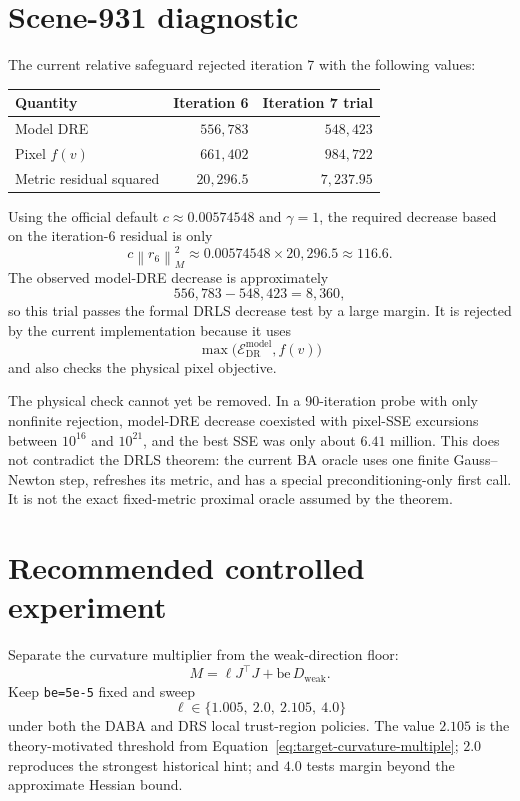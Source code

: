 \documentclass[11pt]{article}
\newcommand{\Edr}{\mathcal{E}_{\mathrm{DR}}}
\newcommand{\norm}[1]{\left\lVert #1\right\rVert}
\begin{document}
\section{Scene-931 diagnostic}

The current relative safeguard rejected iteration 7 with the following values:
\begin{center}
\begin{tabular}{lrr}
\toprule
Quantity & Iteration 6 & Iteration 7 trial \\
\midrule
Model DRE & $556{,}783$ & $548{,}423$ \\
Pixel $f(v)$ & $661{,}402$ & $984{,}722$ \\
Metric residual squared & $20{,}296.5$ & $7{,}237.95$ \\
\bottomrule
\end{tabular}
\end{center}

Using the official default $c\approx0.00574548$ and $\gamma=1$, the required
decrease based on the iteration-6 residual is only
\[
  c\norm{r_6}_M^2
  \approx0.00574548\times20{,}296.5
  \approx116.6.
\]
The observed model-DRE decrease is approximately
\[
  556{,}783-548{,}423=8{,}360,
\]
so this trial passes the formal DRLS decrease test by a large margin. It is
rejected by the current implementation because it uses
\begin{equation}
  \max\bigl(\Edr^{\mathrm{model}},f(v)\bigr)
  \label{eq:sandwich}
\end{equation}
and also checks the physical pixel objective.

The physical check cannot yet be removed. In a 90-iteration probe with only
nonfinite rejection, model-DRE decrease coexisted with pixel-SSE excursions
between $10^{16}$ and $10^{21}$, and the best SSE was only about $6.41$ million.
This does not contradict the DRLS theorem: the current BA oracle uses one
finite Gauss--Newton step, refreshes its metric, and has a special
preconditioning-only first call. It is not the exact fixed-metric proximal
oracle assumed by the theorem.

\section{Recommended controlled experiment}

Separate the curvature multiplier from the weak-direction floor:
\begin{equation}
  M=\ell J^\top J+\mathrm{be}\,D_{\mathrm{weak}}.
  \label{eq:proposed-metric}
\end{equation}
Keep \texttt{be=5e-5} fixed and sweep
\begin{equation}
  \ell\in\{1.005,\ 2.0,\ 2.105,\ 4.0\}
  \label{eq:lip-sweep}
\end{equation}
under both the DABA and DRS local trust-region policies. The value $2.105$ is
the theory-motivated threshold from
Equation~\eqref{eq:target-curvature-multiple}; $2.0$ reproduces the strongest
historical hint; and $4.0$ tests margin beyond the approximate Hessian bound.
\end{document}

